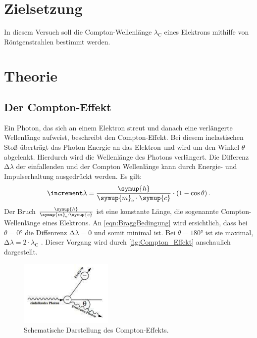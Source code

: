 \section{Zielsetzung}
In diesem Versuch soll die Compton-Wellenlänge $\lambda_\text{C}$ eines Elektrons mithilfe von Röntgenstrahlen bestimmt werden.

\section{Theorie}
\label{sec:Theorie}
\subsection{Der Compton-Effekt}
Ein Photon, das sich an einem Elektron streut und danach eine verlängerte Wellenlänge aufweist, beschreibt den Compton-Effekt.
Bei diesem inelastischen Stoß überträgt das Photon Energie an das Elektron und wird um den Winkel $\theta$ abgelenkt.
Hierdurch wird die Wellenlänge des Photons verlängert.
Die Differenz $\increment \lambda$ der einfallenden und der Compton Wellenlänge kann durch Energie- und Impulserhaltung ausgedrückt werden.
Es gilt:
\begin{equation}\label{eqn:diff_lambda}
    \increment \lambda = \frac{\symup{h}}{\symup{m}_\text{e} \cdot \symup{c}} \cdot (1 - \cos\theta) \, .
\end{equation}
Der Bruch $\frac{\symup{h}}{\symup{m}_\text{e} \cdot \symup{c}}$ ist eine konstante Länge, die sogenannte Compton-Wellenlänge eines Elektrons.
An \eqref{eqn:BraggBedingung} wird ersichtlich, dass bei $\theta = 0°$ die Diffenrenz $\increment \lambda = 0$ und somit minimal ist.
Bei $\theta = 180°$ ist sie maximal, $\increment \lambda = 2 \cdot \lambda_\text{C}$ .
Dieser Vorgang wird durch \autoref{fig:Compton_Effekt} anschaulich dargestellt.

\begin{figure}
    \centering
    \includegraphics[width=0.4\textwidth]{bilder/compton_effekt.pdf}
    \caption{Schematische Darstellung des Compton-Effekts.\cite{anleitung}}
    \label{fig:Compton_Effekt}
\end{figure}

